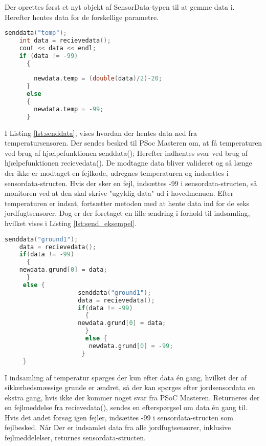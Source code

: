 Der oprettes først et nyt objekt af SensorData-typen til at gemme data i.
Herefter hentes data for de forskellige parametre.

\begin{lstlisting}[language=C ,caption=indsamling af temperatur og fejlsikring, label=lst:senddata]
	senddata("temp");
	int data = recievedata();
	cout << data << endl;
	if (data != -99)
	  {
		
	    newdata.temp = (double(data)/2)-20;
	  }
	  else
	  {
	    newdata.temp = -99;
	  }
\end{lstlisting}

I Listing \ref{lst:senddata}, vises hvordan der hentes data ned fra temperatursensoren. Der sendes besked til PSoc Masteren om, at få temperaturen ved brug af hjælpefunktionen senddata();
Herefter indhentes svar ved brug af hjælpefunktionen recievedata(). De modtagne data bliver valideret og så længe der ikke er modtaget en fejlkode, udregnes temperaturen og indsættes i sensordata-structen. Hvis der sker en fejl, indsættes -99 i sensordata-structen, så monitoren ved at den skal skrive "ugyldig data" ud i hovedmenuen.	
Efter temperaturen er indsat, fortsætter metoden med at hente data ind for de seks jordfugtsensorer. Dog er der foretaget en lille ændring i forhold til indsamling, hvilket vises i Listing \ref{lst:send_eksempel}.

\begin{lstlisting}[language=C ,caption=indsamling af jordfugtighedsdata og fejlsikring, label=lst:send_eksempel]
senddata("ground1");
    data = recievedata();
    if(data != -99)
      {
	newdata.grund[0] = data;
      }	
     else {
                    senddata("ground1");
                    data = recievedata();
                    if(data != -99)
                      {
                    newdata.grund[0] = data;
                      }
                      else {
                       newdata.grund[0] = -99;
                     }
     }
\end{lstlisting}
  
I indsamling af temperatur spørges der kun efter data én gang, hvilket der af sikkerhedsmæssige grunde er ændret, så der kan spørges efter jordsensordata en ekstra gang, hvis ikke der kommer noget svar fra PSoC Masteren. Returneres der en fejlmeddelse fra recievedata(), sendes en efterspørgsel om data én gang til. Hvis det andet forsøg igen fejler, indsættes -99 i sensordata-structen som fejlbesked.
Når Der er indsamlet data fra alle jordfugtsensorer, inklusive fejlmeddelelser, returnes sensordata-structen.

